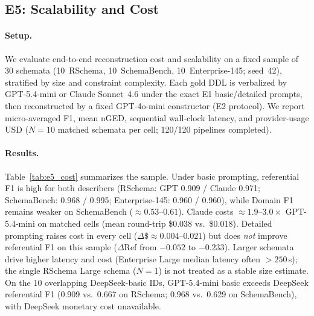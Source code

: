 \subsection{E5: Scalability and Cost}
\label{sec:e5}

\paragraph{Setup.}
We evaluate end-to-end reconstruction cost and scalability on a fixed sample of
30 schemata (10~RSchema, 10~SchemaBench, 10~Enterprise-145; seed~42), stratified
by size and constraint complexity.
Each gold DDL is verbalized by GPT-5.4-mini or Claude Sonnet~4.6 under the exact
E1 basic/detailed prompts, then reconstructed by a fixed GPT-4o-mini constructor
(E2 protocol).
We report micro-averaged F1, mean nGED, sequential wall-clock latency, and
provider-usage USD ($N{=}10$ matched schemata per cell; 120/120 pipelines completed).

\paragraph{Results.}
Table~\ref{tab:e5_cost} summarizes the sample.
Under basic prompting, referential F1 is high for both describers
(RSchema: GPT 0.909 / Claude 0.971; SchemaBench: 0.968 / 0.995;
Enterprise-145: 0.960 / 0.960), while Domain F1 remains weaker on SchemaBench
(${\approx}0.53$--$0.61$).
Claude costs ${\approx}1.9$--$3.0\times$ GPT-5.4-mini on matched cells
(mean round-trip \$0.038 vs.\ \$0.018).
Detailed prompting raises cost in every cell
($\Delta\$ {\approx}0.004$--$0.021$) but does \emph{not} improve referential F1
on this sample ($\Delta$Ref from $-0.052$ to $-0.233$).
Larger schemata drive higher latency and cost (Enterprise Large median latency
often ${>}250$\,s); the single RSchema Large schema ($N{=}1$) is not treated as
a stable size estimate.
On the 10 overlapping DeepSeek-basic IDs, GPT-5.4-mini basic exceeds DeepSeek
referential F1 (0.909 vs.\ 0.667 on RSchema; 0.968 vs.\ 0.629 on SchemaBench),
with DeepSeek monetary cost unavailable.
